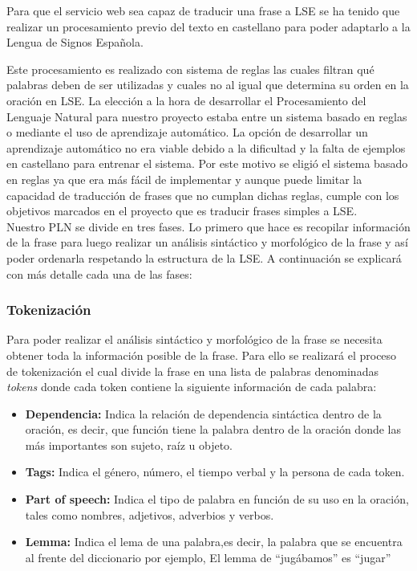Para que el servicio web sea capaz de traducir una frase a LSE se ha tenido que realizar un procesamiento previo del texto en castellano para poder adaptarlo a la Lengua de Signos Española.


Este procesamiento es realizado con sistema de reglas las cuales filtran qué palabras deben de ser utilizadas y cuales no al igual que determina su orden en la oración en LSE. La elección a la hora de desarrollar el Procesamiento del Lenguaje Natural para nuestro proyecto estaba entre un sistema basado en reglas o mediante el uso de aprendizaje automático. La opción de desarrollar un aprendizaje automático no era viable debido a la dificultad y la falta de ejemplos en castellano para entrenar el sistema. Por este motivo se eligió el sistema basado en reglas ya que era más fácil de implementar y aunque puede limitar la capacidad de traducción de frases que no cumplan dichas reglas, cumple con los objetivos marcados en el proyecto que es traducir frases simples a LSE.\\

Nuestro PLN se divide en tres fases. Lo primero que hace es recopilar información de la frase para luego realizar un análisis sintáctico y morfológico de la frase y así poder ordenarla respetando la estructura de la LSE. A continuación se explicará con más detalle cada una de las fases:

\subsubsection{Tokenización} 
Para poder realizar el análisis sintáctico y morfológico de la frase se necesita obtener toda la información posible de la frase. Para ello se realizará el proceso de tokenización el cual divide la frase en una lista de palabras denominadas \textit{tokens} donde cada token contiene la siguiente información de cada palabra:


\begin{itemize}
	
	\item \textbf{Dependencia:} Indica la relación de dependencia sintáctica dentro de la oración, es decir, que función tiene la palabra dentro de la oración donde las más importantes son sujeto, raíz u objeto.
	\item \textbf{Tags:} Indica el género, número, el tiempo verbal y la persona de cada token.
	\item \textbf{Part of speech:} Indica el tipo de palabra en función de su uso en la oración, tales como nombres, adjetivos, adverbios y verbos.
	\item \textbf{Lemma:} Indica el lema de una palabra,es decir, la palabra que se encuentra al frente del diccionario por ejemplo, El lemma de ``jugábamos'' es ``jugar''
	
\end{itemize}


